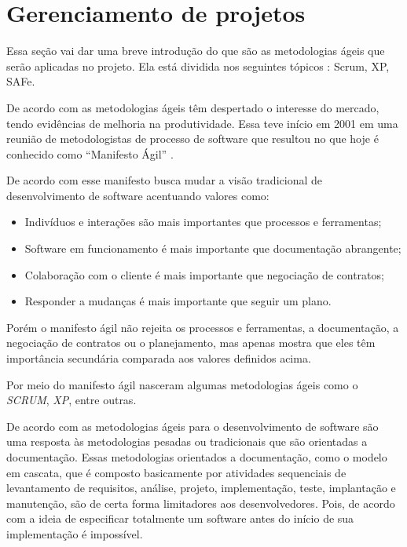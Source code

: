 \section{Gerenciamento de projetos}

Essa seção vai dar uma breve introdução do que são as metodologias ágeis que serão aplicadas no projeto. Ela está dividida nos seguintes tópicos : Scrum, XP, SAFe.

De acordo com \cite{lima} as metodologias ágeis têm despertado o interesse do mercado, tendo evidências de melhoria na produtividade. Essa teve início em 2001 em uma reunião de metodologistas de processo de software que resultou no que hoje é conhecido como “Manifesto Ágil” \cite{beck}.

De acordo com \cite{beck} esse manifesto busca mudar a visão tradicional de desenvolvimento de software acentuando valores como:

\begin{itemize}
  \item Indivíduos e interações são mais importantes que processos e ferramentas;
  \item Software em funcionamento é mais importante que documentação abrangente;
  \item Colaboração com o cliente é mais importante que negociação de contratos;
  \item Responder a mudanças é mais importante que seguir um plano.
\end{itemize}

Porém o manifesto ágil não rejeita os processos e ferramentas, a documentação, a negociação de contratos ou o planejamento, mas apenas mostra que eles têm importância secundária comparada aos valores definidos acima. \cite{lima}

Por meio do manifesto ágil nasceram algumas metodologias ágeis como o \textit{SCRUM}, \textit{XP}, entre outras.

De acordo com \cite{soares} as metodologias ágeis para o desenvolvimento de software são uma resposta às metodologias pesadas ou tradicionais que são orientadas a documentação. Essas metodologias orientados a documentação, como o modelo em cascata, que é composto basicamente por atividades sequenciais de levantamento de requisitos, análise, projeto, implementação, teste, implantação e manutenção, são de certa forma limitadores aos desenvolvedores. Pois, de acordo com \cite{brooks} a ideia de especificar totalmente um software antes do início de sua implementação é impossível.


